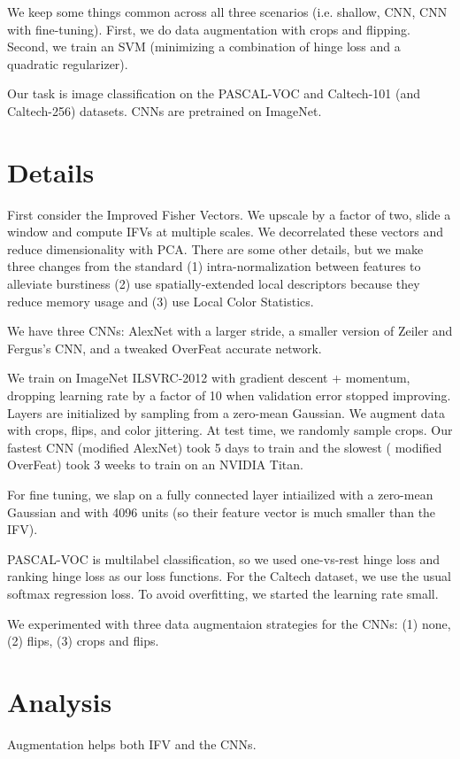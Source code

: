 \documentclass[a4paper]{article}
\begin{document}
We keep some things common across all three scenarios (i.e. shallow, CNN,
CNN with fine-tuning). First, we do data augmentation with crops and flipping.
Second, we train an SVM (minimizing a combination of hinge loss and a quadratic
regularizer).

Our task is image classification on the PASCAL-VOC and Caltech-101 (and
Caltech-256) datasets. CNNs are pretrained on ImageNet.

\section{Details}
First consider the Improved Fisher Vectors. We upscale by a factor of two,
slide a window and compute IFVs at multiple scales. We decorrelated these
vectors and reduce dimensionality with PCA. There are some other details, but
we make three changes from the standard (1) intra-normalization between features
to alleviate burstiness (2) use spatially-extended local descriptors because
they reduce memory usage and (3) use Local Color Statistics.

We have three CNNs: AlexNet with a larger stride, a smaller version of Zeiler
and Fergus's CNN, and a tweaked OverFeat accurate network.

We train on ImageNet ILSVRC-2012 with gradient descent + momentum, dropping
learning rate by a factor of 10 when validation error stopped improving. Layers
are initialized by sampling from a zero-mean Gaussian. We augment data with
crops, flips, and color jittering. At test time, we randomly sample crops.
Our fastest CNN (modified AlexNet) took 5 days to train and the slowest (
modified OverFeat) took 3 weeks to train on an NVIDIA Titan.

For fine tuning, we slap on a fully connected layer intiailized with a zero-mean
Gaussian and with 4096 units (so their feature vector is much smaller than the
IFV).

PASCAL-VOC is multilabel classification, so we used one-vs-rest hinge loss and
ranking hinge loss as our loss functions. For the Caltech dataset, we use
the usual softmax regression loss. To avoid overfitting, we started the
learning rate small.

We experimented with three data augmentaion strategies for the CNNs: (1) none,
(2) flips, (3) crops and flips.

\section{Analysis}
Augmentation helps both IFV and the CNNs.
\end{document}
